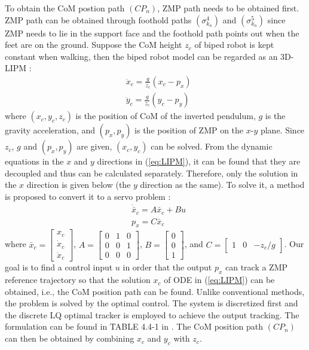 \documentclass{ieeeaccess}
\begin{document}
To obtain the CoM postion path $(CP_n)$, ZMP path needs to be obtained first. ZMP path can be obtained through foothold paths $(\sigma^{4}_{k_n})$ and $(\sigma^{5}_{k_n})$ since ZMP needs to lie in the support face and the foothold path points out when the feet are on the ground. Suppose the CoM height $z_c$ of biped robot is kept constant when walking, then the biped robot model can be regarded as an 3D-LIPM \cite{kajita2001real}:
\begin{equation} \label{eq:LIPM}
    \begin{split}
        & \ddot{x}_c = \frac{g}{z_c}(x_c - p_x) \\
        & \ddot{y}_c = \frac{g}{z_c}(y_c - p_y)
    \end{split}
\end{equation}
where $(x_c, y_c, z_c)$ is the position of CoM of the inverted pendulum, $g$ is the gravity acceleration, and $(p_x,p_y)$ is the position of ZMP on the $x$-$y$ plane. Since $z_c$, $g$ and $(p_x,p_y)$ are given, $(x_c, y_c)$ can be solved. From the dynamic equations in the $x$ and $y$ directions in (\ref{eq:LIPM}), it can be found that they are decoupled and thus can be calculated separately. Therefore, only the solution in the $x$ direction is given below (the $y$ direction as the same). To solve it, a method is proposed to convert it to a servo problem \cite{1241826}:
\begin{equation} \label{eq:output tracking}
    \begin{split}
        & \dot{\bar{x}}_c = A\bar{x}_c + Bu \\
        & p_x = C\bar{x}_c
    \end{split}
\end{equation}
where $\bar{x}_c = \begin{bmatrix}
    x_c \\ \dot{x}_c \\ \ddot{x}_c
\end{bmatrix}$, $A = \begin{bmatrix}
    0 & 1 & 0 \\ 0 & 0 & 1 \\ 0 & 0 & 0
\end{bmatrix}$, $B = \begin{bmatrix}
    0 \\ 0 \\ 1
\end{bmatrix}$, and $C = \begin{bmatrix}
    1 & 0 & -z_c/g
\end{bmatrix}$. Our goal is to find a control input $u$ in order that the output $p_x$ can track a ZMP reference trajectory so that the solution $x_c$ of ODE in (\ref{eq:LIPM}) can be obtained, i.e., the CoM position path can be found. Unlike conventional methods, the problem is solved by the optimal control. The system is discretized first and the discrete LQ optimal tracker is employed to achieve the output tracking. The formulation can be found in TABLE 4.4-1 in \cite{lewis2012optimal}. The CoM position path $(CP_n)$ can then be obtained by combining $x_c$ and $y_c$ with $z_c$.
\end{document}

